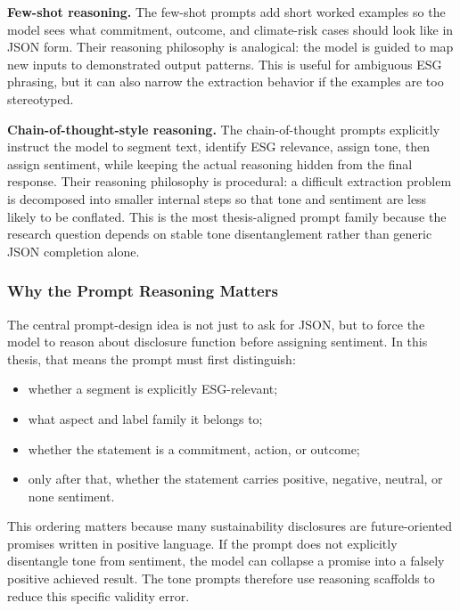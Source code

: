 \documentclass[english, online, cse, master]{dithesis}
\providecommand{\tightlist}{\setlength{\itemsep}{0pt}\setlength{\parskip}{0pt}}
\begin{document}
\textbf{Few-shot reasoning.} The few-shot prompts add short worked examples so the model sees what commitment, outcome, and climate-risk cases should look like in JSON form. Their reasoning philosophy is analogical: the model is guided to map new inputs to demonstrated output patterns. This is useful for ambiguous ESG phrasing, but it can also narrow the extraction behavior if the examples are too stereotyped.

\textbf{Chain-of-thought-style reasoning.} The chain-of-thought prompts explicitly instruct the model to segment text, identify ESG relevance, assign tone, then assign sentiment, while keeping the actual reasoning hidden from the final response. Their reasoning philosophy is procedural: a difficult extraction problem is decomposed into smaller internal steps so that tone and sentiment are less likely to be conflated. This is the most thesis-aligned prompt family because the research question depends on stable tone disentanglement rather than generic JSON completion alone.

\subsubsection{Why the Prompt Reasoning Matters}\label{why-the-prompt-reasoning-matters}

The central prompt-design idea is not just to ask for JSON, but to force the model to reason about disclosure function before assigning sentiment. In this thesis, that means the prompt must first distinguish:

\begin{itemize}
\def\labelenumi{\arabic{enumi}.}
\tightlist
\item
  whether a segment is explicitly ESG-relevant;
\item
  what aspect and label family it belongs to;
\item
  whether the statement is a commitment, action, or outcome;
\item
  only after that, whether the statement carries positive, negative, neutral, or none sentiment.
\end{itemize}

This ordering matters because many sustainability disclosures are future-oriented promises written in positive language. If the prompt does not explicitly disentangle tone from sentiment, the model can collapse a promise into a falsely positive achieved result. The tone prompts therefore use reasoning scaffolds to reduce this specific validity error.
\end{document}
